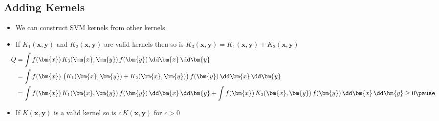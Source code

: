 \begin{slide}
\section[-1]{Adding Kernels}

\begin{PauseHighLight}
  \begin{itemize}
  \item We can construct SVM kernels from other kernels\pause
  \item If $K_1(\bm{x}, \bm{y})$ and  $K_2(\bm{x}, \bm{y})$ are valid
    kernels then so is $K_3(\bm{x}, \bm{y}) = K_1(\bm{x}, \bm{y}) +
    K_2(\bm{x}, \bm{y})$
    \begin{align*}
      \hspace*{-1em}Q &= \int f(\bm{x})\, K_3(\bm{x}, \bm{y}) \, f(\bm{y})
      \, \dd \bm{x}  \, \dd \bm{y} \\
      &=\int f(\bm{x})\, \left( \strut K_1(\bm{x}, \bm{y}) + K_2(\bm{x},
      \bm{y}) \right)  f(\bm{y}) \, \dd \bm{x}  \, \dd \bm{y} \\
      &=\int f(\bm{x})\, K_1(\bm{x}, \bm{y}) \, f(\bm{y})
      \, \dd \bm{x}  \, \dd \bm{y} +
      \int f(\bm{x})\, K_2(\bm{x}, \bm{y}) \, f(\bm{y})
      \, \dd \bm{x}  \, \dd \bm{y}
      \geq 0   \pause
    \end{align*}
  \item If $K(\bm{x}, \bm{y})$ is a valid kernel so is $c\,K(\bm{x},
    \bm{y})$ for $c>0$\pause
  \end{itemize}
\end{PauseHighLight}

\end{slide}


